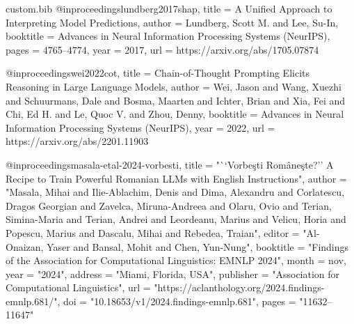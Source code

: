 \begin{filecontents*}[overwrite]{custom.bib}
@inproceedings{lundberg2017shap,
  title        = {A Unified Approach to Interpreting Model Predictions},
  author       = {Lundberg, Scott M. and Lee, Su-In},
  booktitle    = {Advances in Neural Information Processing Systems (NeurIPS)},
  pages        = {4765--4774},
  year         = {2017},
  url          = {https://arxiv.org/abs/1705.07874}
}

@inproceedings{wei2022cot,
  title        = {Chain-of-Thought Prompting Elicits Reasoning in Large Language Models},
  author       = {Wei, Jason and Wang, Xuezhi and Schuurmans, Dale and Bosma, Maarten and Ichter, Brian and Xia, Fei and Chi, Ed H. and Le, Quoc V. and Zhou, Denny},
  booktitle    = {Advances in Neural Information Processing Systems (NeurIPS)},
  year         = {2022},
  url          = {https://arxiv.org/abs/2201.11903}
}

@inproceedings{masala-etal-2024-vorbesti,
    title = "``Vorbe{\c s}ti Rom{\^a}ne{\c s}te?'' A Recipe to Train Powerful {R}omanian {LLM}s with {E}nglish Instructions",
    author = "Masala, Mihai  and
      Ilie-Ablachim, Denis  and
      Dima, Alexandru  and
      Corlatescu, Dragos Georgian  and
      Zavelca, Miruna-Andreea  and
      Olaru, Ovio  and
      Terian, Simina-Maria  and
      Terian, Andrei  and
      Leordeanu, Marius  and
      Velicu, Horia  and
      Popescu, Marius  and
      Dascalu, Mihai  and
      Rebedea, Traian",
    editor = "Al-Onaizan, Yaser  and
      Bansal, Mohit  and
      Chen, Yun-Nung",
    booktitle = "Findings of the Association for Computational Linguistics: EMNLP 2024",
    month = nov,
    year = "2024",
    address = "Miami, Florida, USA",
    publisher = "Association for Computational Linguistics",
    url = "https://aclanthology.org/2024.findings-emnlp.681/",
    doi = "10.18653/v1/2024.findings-emnlp.681",
    pages = "11632--11647"
}
\end{filecontents*}

\documentclass[11pt]{article}

\usepackage[review]{acl}

\usepackage{times}
\usepackage{latexsym}

\usepackage[T1]{fontenc}

